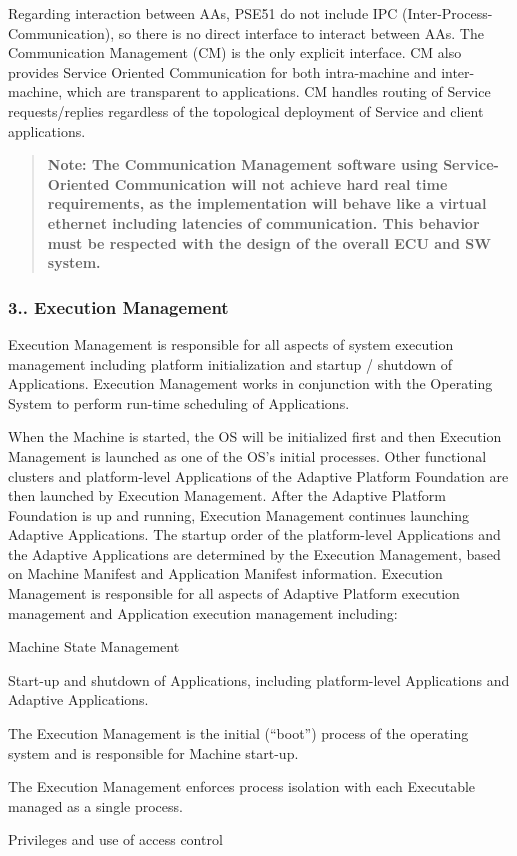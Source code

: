 Regarding interaction between A\+As, P\+S\+E51 do not include I\+PC (Inter-\/\+Process-\/\+Communication), so there is no direct interface to interact between A\+As. The Communication Management (CM) is the only explicit interface. CM also provides Service Oriented Communication for both intra-\/machine and inter-\/machine, which are transparent to applications. CM handles routing of Service requests/replies regardless of the topological deployment of Service and client applications.

\begin{quote}
{\bfseries Note\+: The Communication Management software using Service-\/\+Oriented Communication will not achieve hard real time requirements, as the implementation will behave like a virtual ethernet including latencies of communication. This behavior must be respected with the design of the overall E\+CU and SW system.} \end{quote}


\subsubsection*{3.. Execution Management}

Execution Management is responsible for all aspects of system execution management including platform initialization and startup / shutdown of Applications. Execution Management works in conjunction with the Operating System to perform run-\/time scheduling of Applications. 

When the Machine is started, the OS will be initialized first and then Execution Management is launched as one of the O\+S’s initial processes. Other functional clusters and platform-\/level Applications of the Adaptive Platform Foundation are then launched by Execution Management. After the Adaptive Platform Foundation is up and running, Execution Management continues launching Adaptive Applications. The startup order of the platform-\/level Applications and the Adaptive Applications are determined by the Execution Management, based on Machine Manifest and Application Manifest information.  Execution Management is responsible for all aspects of Adaptive Platform execution management and Application execution management including\+:


\begin{DoxyItemize}
\item Machine State Management
\item Start-\/up and shutdown of Applications, including platform-\/level Applications and Adaptive Applications.
\item The Execution Management is the initial (“boot”) process of the operating system and is responsible for Machine start-\/up.
\item The Execution Management enforces process isolation with each Executable managed as a single process.
\item Privileges and use of access control
\end{DoxyItemize}

